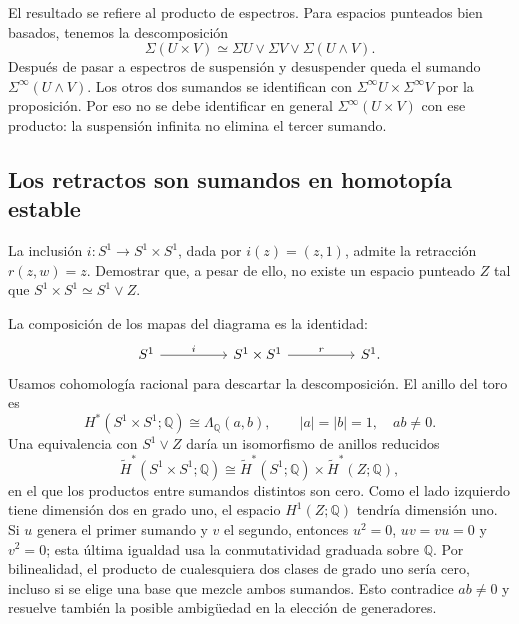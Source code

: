 \begin{obs}
El resultado se refiere al producto de espectros. Para espacios punteados bien basados, tenemos la descomposición
\[
\Sigma(U\times V)\simeq\Sigma U\vee\Sigma V\vee\Sigma(U\wedge V).
\]
Después de pasar a espectros de suspensión y desuspender queda el sumando $\Sigma^\infty(U\wedge V)$. Los otros dos sumandos se identifican con $\Sigma^\infty U\times\Sigma^\infty V$ por la proposición. Por eso no se debe identificar en general $\Sigma^\infty(U\times V)$ con ese producto: la suspensión infinita no elimina el tercer sumando.
\end{obs}

\subsection{Los retractos son sumandos en homotopía estable}

\begin{ejer}\label{ejer:c17-toro}
La inclusión $i\colon S^1\to S^1\times S^1$, dada por $i(z)=(z,1)$, admite la retracción $r(z,w)=z$. Demostrar que, a pesar de ello, no existe un espacio punteado $Z$ tal que $S^1\times S^1\simeq S^1\vee Z$.
\end{ejer}

\begin{sol}
La composición de los mapas del diagrama es la identidad:
\[
\begin{tikzcd}[column sep=huge]
S^1\arrow[r,"i"]&S^1\times S^1\arrow[r,"r"]&S^1.
\end{tikzcd}
\]
Usamos cohomología racional para descartar la descomposición. El anillo del toro es
\[
H^*(S^1\times S^1;\mathbb Q)\cong\Lambda_{\mathbb Q}(a,b),
\qquad |a|=|b|=1,\quad ab\ne0.
\]
Una equivalencia con $S^1\vee Z$ daría un isomorfismo de anillos reducidos
\[
\widetilde H^*(S^1\times S^1;\mathbb Q)
\cong\widetilde H^*(S^1;\mathbb Q)\times\widetilde H^*(Z;\mathbb Q),
\]
en el que los productos entre sumandos distintos son cero. Como el lado izquierdo tiene dimensión dos en grado uno, el espacio $H^1(Z;\mathbb Q)$ tendría dimensión uno. Si $u$ genera el primer sumando y $v$ el segundo, entonces $u^2=0$, $uv=vu=0$ y $v^2=0$; esta última igualdad usa la conmutatividad graduada sobre $\mathbb Q$. Por bilinealidad, el producto de cualesquiera dos clases de grado uno sería cero, incluso si se elige una base que mezcle ambos sumandos. Esto contradice $ab\ne0$ y resuelve también la posible ambigüedad en la elección de generadores.
\end{sol}


